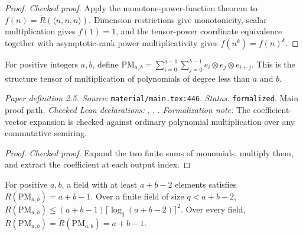 \begin{proof}
\leanok
{}
\textit{Checked proof.} Apply the monotone-power-function theorem to $f(n)=\widetilde R(\langle n,n,n\rangle)$. Dimension restrictions give monotonicity, scalar multiplication gives $f(1)=1$, and the tensor-power coordinate equivalence together with asymptotic-rank power multiplicativity gives $f(n^k)=f(n)^k$.
\end{proof}

\renewcommand{\thetheorem}{2.5}
\begin{definition}
\label{def:polynomial-multiplication}
\leanok
{}
For positive integers $a,b$, define $\mathrm{PM}_{a,b}=\sum_{i=0}^{a-1}\sum_{j=0}^{b-1}e_i\otimes e_j\otimes e_{i+j}$. This is the structure tensor of multiplication of polynomials of degree less than $a$ and $b$.
\end{definition}

\noindent\textit{Paper definition 2.5. Source:} \texttt{material/main.tex:446}.
\textit{Status:} \texttt{formalized}. Main proof path.
\textit{Checked Lean declarations:} , , .
\textit{Formalization note:} The coefficient-vector expansion is checked against ordinary polynomial multiplication over any commutative semiring.

\begin{proof}
\leanok
\textit{Checked proof.} Expand the two finite sums of monomials, multiply them, and extract the coefficient at each output index.
\end{proof}

\renewcommand{\thetheorem}{2.6}
\begin{lemma}
\label{lem:poly-mult-from-sum}
\manuscriptproof
{}
\leanok
For positive $a,b$, a field with at least $a+b-2$ elements satisfies $R(\mathrm{PM}_{a,b})=a+b-1$. Over a finite field of size $q<a+b-2$, $R(\mathrm{PM}_{a,b})\le(a+b-1)\lceil\log_q(a+b-2)\rceil^2$. Over every field, $\underline R(\mathrm{PM}_{a,b})=\widetilde R(\mathrm{PM}_{a,b})=a+b-1$.
\end{lemma}

